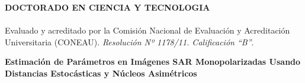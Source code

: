 \begin{titlepage}
\vspace{-4cm}
\begin{center}
	\textbf{DOCTORADO EN CIENCIA Y TECNOLOGIA}\vspace{-3mm}\\
	\hrulefill\\
	{\small Evaluado y acreditado por la Comisión Nacional de Evaluación y Acreditación Universitaria (CONEAU). \emph{Resolución Nº 1178/11. Calificación “B”}.}
\end{center}

\vspace{1cm}

\noindent\makebox[\linewidth]{\rule{15 cm}{1.5pt}}
\begin{center}
	\textbf{{\LARGE Estimación de Parámetros en Imágenes SAR Monopolarizadas Usando Distancias Estocásticas y Núcleos Asimétricos}}
\end{center}
\noindent\makebox[\linewidth]{\rule{15 cm}{1.5pt}}

\vspace{1cm}


\vspace{2.5cm}

\vspace{1cm}

\vspace{1.5cm}

  \newpage
\end{titlepage}
\newpage
$\ $
\thispagestyle{empty} %





